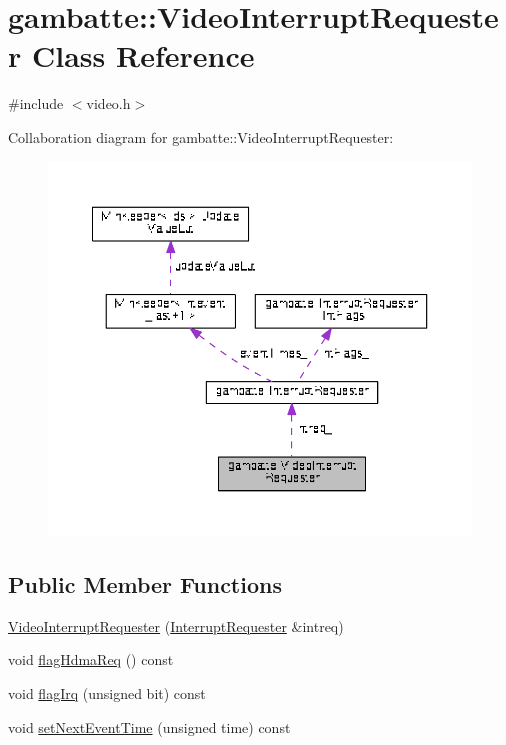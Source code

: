 \hypertarget{classgambatte_1_1VideoInterruptRequester}{}\section{gambatte\+:\+:Video\+Interrupt\+Requester Class Reference}
\label{classgambatte_1_1VideoInterruptRequester}


{\ttfamily \#include $<$video.\+h$>$}



Collaboration diagram for gambatte\+:\+:Video\+Interrupt\+Requester\+:
\nopagebreak
\begin{figure}[H]
\begin{center}
\leavevmode
\includegraphics[width=350pt]{classgambatte_1_1VideoInterruptRequester__coll__graph}
\end{center}
\end{figure}
\subsection*{Public Member Functions}
\begin{DoxyCompactItemize}
\item 
\hyperlink{classgambatte_1_1VideoInterruptRequester_a163ac951fad7adaf1c1a632250f7e3c7}{Video\+Interrupt\+Requester} (\hyperlink{classgambatte_1_1InterruptRequester}{Interrupt\+Requester} \&intreq)
\item 
void \hyperlink{classgambatte_1_1VideoInterruptRequester_a939dd048f06a4bb9c31555a4e7ee4061}{flag\+Hdma\+Req} () const
\item 
void \hyperlink{classgambatte_1_1VideoInterruptRequester_a672fd9d7699111ae20ed8185e95cab2e}{flag\+Irq} (unsigned bit) const
\item 
void \hyperlink{classgambatte_1_1VideoInterruptRequester_a833ca6d5286d067a5b35f451eb428894}{set\+Next\+Event\+Time} (unsigned time) const
\end{DoxyCompactItemize}
